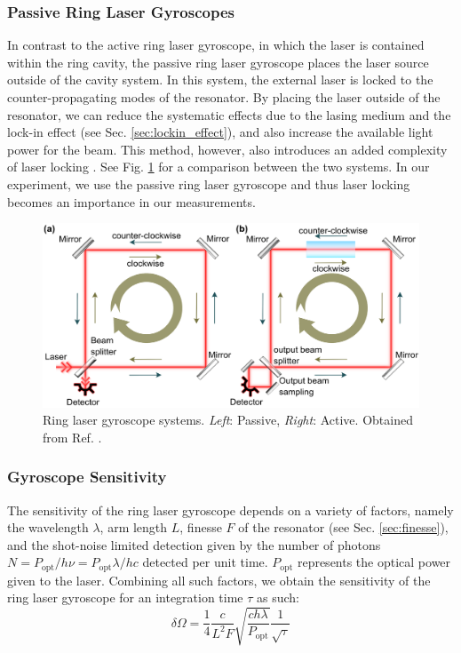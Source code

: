 \documentclass[a4paper]{report}
\numberwithin{equation}{section}
\begin{document}
\subsubsection{Passive Ring Laser Gyroscopes}

In contrast to the active ring laser gyroscope, in which the laser is contained within the ring cavity, the passive ring laser
gyroscope places the laser source outside of the cavity system. In this system, the external laser is locked to the counter-propagating
modes of the resonator. By placing the laser outside of the resonator, we can reduce the systematic effects due to the lasing medium and 
the lock-in effect (see Sec. \ref{sec:lockin_effect}), and also increase the available light power for the beam. 
This method, however, also introduces an added complexity of laser locking \cite{Groh2021}. See Fig. \ref{fig:passive_active} for a comparison between the two
systems. In our experiment, we use the passive ring laser gyroscope and thus laser locking becomes an importance in our measurements.

\begin{figure}[h!]
	\centering
	\includegraphics[width=0.6\columnwidth]{passive_active_gyroscope.png}
	\caption{Ring laser gyroscope systems. \textit{Left}: Passive, \textit{Right}: Active. Obtained from Ref. \cite{Kudelin2021}.}
	\label{fig:passive_active}
\end{figure}

\subsubsection{Gyroscope Sensitivity}

The sensitivity of the ring laser gyroscope depends on a variety of factors, namely the wavelength $\lambda$, arm length $L$, finesse $F$
of the resonator (see Sec. \ref{sec:finesse}), and the shot-noise limited detection given by the number of photons $N = P_{\text{opt}} / h \nu = P_{\text{opt}} \lambda / hc$ detected per unit time. 
$P_{\text{opt}}$ represents the optical power given to the laser. Combining all such factors, we obtain the sensitivity of the ring laser gyroscope for an integration time $\tau$ as such: 
\begin{equation}
	\delta \Omega = \frac{1}{4} \frac{c}{L^2F}\sqrt{\frac{ch\lambda}{P_{\text{opt}}}} \frac{1}{\sqrt{\tau}}
	\label{eq:gyroscope_sensitivity}
\end{equation}
\end{document}
